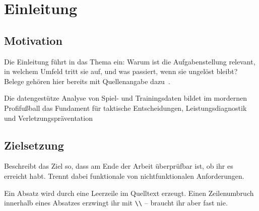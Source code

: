 \chapter{Einleitung}
\abschnittsautor{\alleautoren}

\section{Motivation}

Die Einleitung führt in das Thema ein: Warum ist die Aufgabenstellung
relevant, in welchem Umfeld tritt sie auf, und was passiert, wenn sie
ungelöst bleibt? Belege gehören hier bereits mit Quellenangabe
dazu~\cite{beispiel-buch}.

Die datengestütze Analyse von Spiel- und Trainingsdaten bildet im mordernen
Profifußball das Fundament für taktische Entscheidungen, Leistungsdiagnostik
und Verletzungspräventation~\cite{}

\section{Zielsetzung}

Beschreibt das Ziel so, dass am Ende der Arbeit überprüfbar ist, ob ihr es
erreicht habt. Trennt dabei funktionale von nichtfunktionalen Anforderungen.

Ein Absatz wird durch eine Leerzeile im Quelltext erzeugt. Einen Zeilenumbruch
innerhalb eines Absatzes erzwingt ihr mit \verb|\\| -- braucht ihr aber fast nie.
